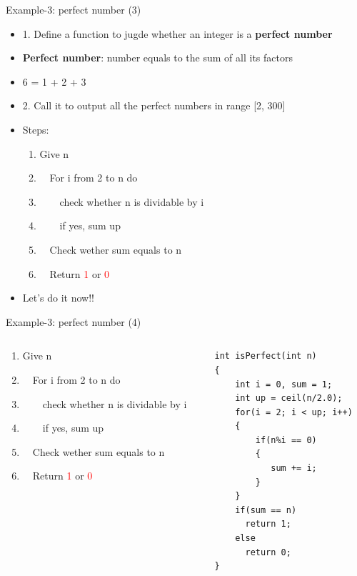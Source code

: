 \begin{frame}[fragile]{Example-3: perfect number (3)}
\begin{itemize}
	\item {1. Define a function to jugde whether an integer is a \textbf{perfect number}}
	\item {\textbf{Perfect number}: number equals to the sum of all its factors}
	\item {6 = 1 + 2 + 3}
	\item {2. Call it to output all the perfect numbers in range [2, 300]}
	\item {Steps:}
	\begin{enumerate}
		\item {Give n}
		\item {~~For i from 2 to n do}
		\item {~~~~check whether n is dividable by i}
		\item {~~~~if yes, sum up}
		\item {~~Check wether sum equals to n}
		\item {~~Return \textcolor{red}{1} or \textcolor{red}{0}}
	\end{enumerate}
	\item {Let's do it now!!}
\end{itemize}
\end{frame}

\begin{frame}[fragile]{Example-3: perfect number (4)}
\vspace{-0.15in}
\begin{columns}
\begin{column}{0.55\linewidth}
\begin{enumerate}
	\item {Give n}
	\item {~~For i from 2 to n do}
	\item {~~~~check whether n is dividable by i}
	\item {~~~~if yes, sum up}
	\item {~~Check wether sum equals to n}
	\item {~~Return \textcolor{red}{1} or \textcolor{red}{0}}
\end{enumerate}
\end{column}
\begin{column}{0.45\linewidth}
\begin{lstlisting}
int isPerfect(int n)
{
    int i = 0, sum = 1;
    int up = ceil(n/2.0);
    for(i = 2; i < up; i++)
    {
        if(n%i == 0)
        {
           sum += i;
        }
    }
    if(sum == n)
      return 1;
    else 
      return 0;
}
\end{lstlisting}
\end{column}
\end{columns}
\end{frame}

